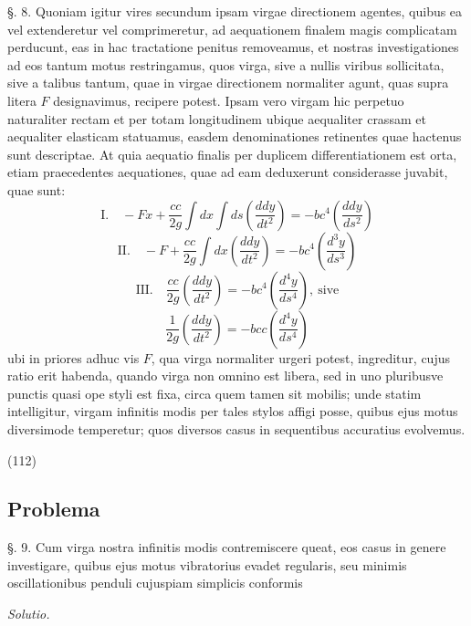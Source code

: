 \documentclass[11pt,a4paper]{article}
\begin{document}
§. 8. Quoniam igitur vires secundum ipsam virgae directionem agentes,
quibus ea vel extenderetur vel comprimeretur, ad aequationem finalem magis
complicatam perducunt, eas in hac tractatione penitus removeamus, et nostras
investigationes ad eos tantum motus restringamus, quos virga, sive a nullis
viribus sollicitata, sive a talibus tantum, quae in virgae directionem
normaliter agunt, quas supra litera $F$ designavimus, recipere potest. Ipsam
vero virgam hic perpetuo naturaliter rectam et per totam longitudinem ubique
aequaliter crassam et aequaliter elasticam statuamus, easdem denominationes
retinentes quae hactenus sunt descriptae. At quia aequatio finalis per
duplicem differentiationem est orta, etiam praecedentes aequationes, quae ad
eam deduxerunt considerasse juvabit, quae sunt:
\[
\text{I.} \quad -Fx + \frac{cc}{2g}\int dx \int ds \left(\frac{ddy}{dt^2}\right) = -bc^4\left(\frac{ddy}{ds^2}\right)
\]
\[
\text{II.} \quad -F + \frac{cc}{2g}\int dx \left(\frac{ddy}{dt^2}\right) = -bc^4\left(\frac{d^3y}{ds^3}\right)
\]
\[
\text{III.} \quad \frac{cc}{2g}\left(\frac{ddy}{dt^2}\right) = -bc^4\left(\frac{d^4y}{ds^4}\right), \ \text{sive}
\]
\[
\frac{1}{2g}\left(\frac{ddy}{dt^2}\right) = -bcc\left(\frac{d^4y}{ds^4}\right)
\]
ubi in priores adhuc vis $F$, qua virga normaliter urgeri potest,
ingreditur, cujus ratio erit habenda, quando virga non omnino est libera, sed
in uno pluribusve punctis quasi ope styli est fixa, circa quem tamen sit
mobilis; unde statim intelligitur, virgam infinitis modis per tales stylos
affigi posse, quibus ejus motus diversimode temperetur; quos diversos casus in
sequentibus accuratius evolvemus.

(112)

\subsection{Problema}

§. 9. Cum virga nostra infinitis modis contremiscere queat, eos casus in
genere investigare, quibus ejus motus vibratorius evadet regularis, seu
minimis oscillationibus penduli cujuspiam simplicis conformis

\emph{Solutio.}
\end{document}
